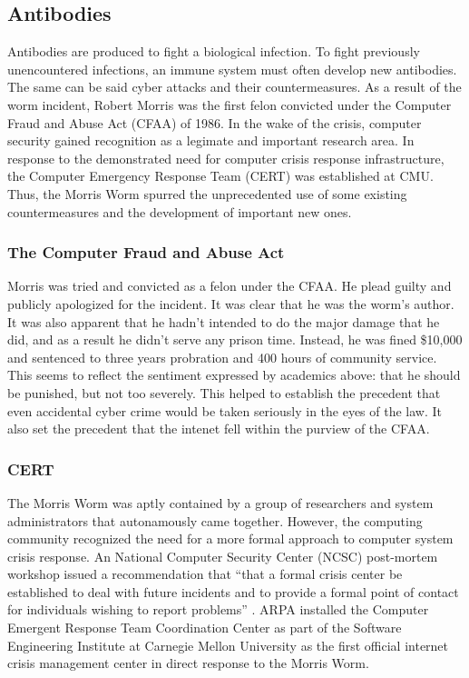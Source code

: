\subsection*{Antibodies}
Antibodies are produced to fight a biological infection. To fight previously
unencountered infections, an immune system must often develop new antibodies.
The same can be said cyber attacks and their countermeasures. As a result of
the worm incident, Robert Morris was the first felon convicted under the
Computer Fraud and Abuse Act (CFAA) of 1986. In the wake of the crisis,
computer security gained recognition as a legimate and important research
area. In response to the demonstrated need for computer crisis response
infrastructure, the Computer Emergency Response Team (CERT) was established at
CMU. Thus, the Morris Worm spurred the unprecedented use of some existing
countermeasures and the development of important new ones.

\subsubsection*{The Computer Fraud and Abuse Act}
Morris was tried and convicted as a felon under the CFAA. He plead guilty and
publicly apologized for the incident. It was clear that he was the worm's
author. It was also apparent that he hadn't intended to do the major damage that
he did, and as a result he didn't serve any prison time. Instead, he was
fined \$10,000 and sentenced to three years probration and 400 hours of
community service\cite{lee_washpost_2013}. This seems to reflect the sentiment
expressed by academics above: that he should be punished, but not too severely.
This helped to establish the precedent that even accidental cyber crime would be
taken seriously in the eyes of the law. It also set the precedent that the
intenet fell within the purview of the CFAA\cite{adams_controlling_1996}. 

\subsubsection*{CERT}
The Morris Worm was aptly contained by a group of researchers and
system administrators that autonamously came together. However, the
computing community recognized the need for a more formal approach to computer
system crisis response. An National Computer Security Center (NCSC) post-mortem
workshop issued a recommendation that ``that a formal crisis center be
established to deal with future incidents and to provide a formal point of
contact for individuals wishing to report problems'' \cite{spafford_crisis_1989}.
ARPA installed the Computer Emergent Response Team Coordination Center
as part of the Software Engineering Institute at Carnegie Mellon University as
the first official internet crisis management center in direct response to the
Morris Worm\cite{fithen_cert_1994}.

